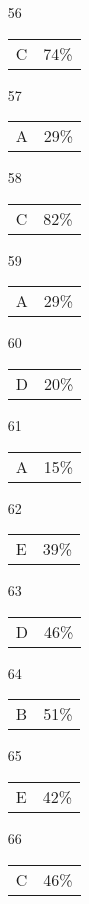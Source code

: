\documentclass{article}
\begin{document}
\begin{multicols}{4}
\begin{enumerate}
       \item[]
    
    \item[56] \begin{tabular}{cc} C & 74\%\end{tabular}
    
    \item[57] \begin{tabular}{cc} A & 29\%\end{tabular}
    
    \item[58] \begin{tabular}{cc} C & 82\%\end{tabular}
    
    \item[59] \begin{tabular}{cc} A & 29\%\end{tabular}
    
    \item[60] \begin{tabular}{cc} D & 20\%\end{tabular}
    
       \item[]
    
    \item[61] \begin{tabular}{cc} A & 15\%\end{tabular}
    
    \item[62] \begin{tabular}{cc} E & 39\%\end{tabular}
    
    \item[63] \begin{tabular}{cc} D & 46\%\end{tabular}
    
    \item[64] \begin{tabular}{cc} B & 51\%\end{tabular}
    
    \item[65] \begin{tabular}{cc} E & 42\%\end{tabular}
    
       \item[]
    
    \item[66] \begin{tabular}{cc} C & 46\%\end{tabular}
    

\end{enumerate}
\end{multicols}
\end{document}
